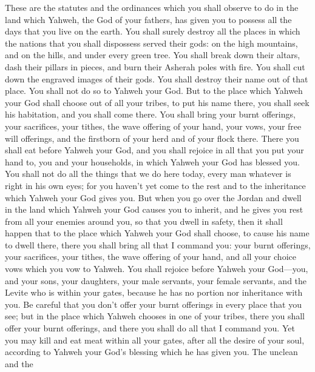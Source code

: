  These are the statutes and the ordinances which you shall
observe to do in the land which Yahweh, the God of your fathers, has
given you to possess all the days that you live on the earth.
 You shall surely destroy all the places in which the
nations that you shall dispossess served their gods: on the high
mountains, and on the hills, and under every green tree. 
You shall break down their altars, dash their pillars in pieces, and
burn their Asherah poles with fire. You shall cut down the engraved
images of their gods. You shall destroy their name out of that place.
 You shall not do so to Yahweh your God. 
But to the place which Yahweh your God shall choose out of all your
tribes, to put his name there, you shall seek his habitation, and you
shall come there.  You shall bring your burnt offerings,
your sacrifices, your tithes, the wave offering of your hand, your vows,
your free will offerings, and the firstborn of your herd and of your
flock there.  There you shall eat before Yahweh your God,
and you shall rejoice in all that you put your hand to, you and your
households, in which Yahweh your God has blessed you.  You
shall not do all the things that we do here today, every man whatever is
right in his own eyes;  for you haven't yet come to the
rest and to the inheritance which Yahweh your God gives you.
 But when you go over the Jordan and dwell in the land
which Yahweh your God causes you to inherit, and he gives you rest from
all your enemies around you, so that you dwell in safety,
 then it shall happen that to the place which Yahweh your
God shall choose, to cause his name to dwell there, there you shall
bring all that I command you: your burnt offerings, your sacrifices,
your tithes, the wave offering of your hand, and all your choice vows
which you vow to Yahweh.  You shall rejoice before Yahweh
your God---you, and your sons, your daughters, your male servants, your
female servants, and the Levite who is within your gates, because he has
no portion nor inheritance with you.  Be careful that you
don't offer your burnt offerings in every place that you see;
 but in the place which Yahweh chooses in one of your
tribes, there you shall offer your burnt offerings, and there you shall
do all that I command you.  Yet you may kill and eat meat
within all your gates, after all the desire of your soul, according to
Yahweh your God's blessing which he has given you. The unclean and the
